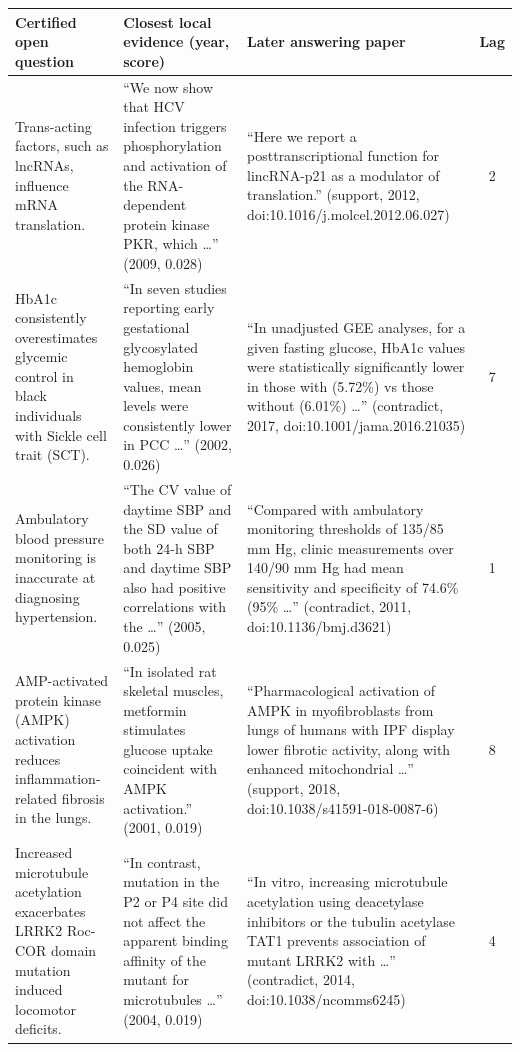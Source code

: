 \begin{tabular}{>{\raggedright\arraybackslash}p{3.0cm}>{\raggedright\arraybackslash}p{4.7cm}>{\raggedright\arraybackslash}p{6.6cm}c}
\toprule
Certified open question & Closest local evidence (year, score) & Later answering paper & Lag \\
\midrule
Trans-acting factors, such as lncRNAs, influence mRNA translation. & ``We now show that HCV infection triggers phosphorylation and activation of the RNA-dependent protein kinase PKR, which \ldots{}'' (2009, 0.028) & ``Here we report a posttranscriptional function for lincRNA-p21 as a modulator of translation.'' (support, 2012, doi:10.1016/j.molcel.2012.06.027) & 2 \\
HbA1c consistently overestimates glycemic control in black individuals with Sickle cell trait (SCT). & ``In seven studies reporting early gestational glycosylated hemoglobin values, mean levels were consistently lower in PCC \ldots{}'' (2002, 0.026) & ``In unadjusted GEE analyses, for a given fasting glucose, HbA1c values were statistically significantly lower in those with (5.72\%) vs those without (6.01\%) \ldots{}'' (contradict, 2017, doi:10.1001/jama.2016.21035) & 7 \\
Ambulatory blood pressure monitoring is inaccurate at diagnosing hypertension. & ``The CV value of daytime SBP and the SD value of both 24-h SBP and daytime SBP also had positive correlations with the \ldots{}'' (2005, 0.025) & ``Compared with ambulatory monitoring thresholds of 135/85 mm Hg, clinic measurements over 140/90 mm Hg had mean sensitivity and specificity of 74.6\% (95\% \ldots{}'' (contradict, 2011, doi:10.1136/bmj.d3621) & 1 \\
AMP-activated protein kinase (AMPK) activation reduces inflammation-related fibrosis in the lungs. & ``In isolated rat skeletal muscles, metformin stimulates glucose uptake coincident with AMPK activation.'' (2001, 0.019) & ``Pharmacological activation of AMPK in myofibroblasts from lungs of humans with IPF display lower fibrotic activity, along with enhanced mitochondrial \ldots{}'' (support, 2018, doi:10.1038/s41591-018-0087-6) & 8 \\
Increased microtubule acetylation exacerbates LRRK2 Roc-COR domain mutation induced locomotor deficits. & ``In contrast, mutation in the P2 or P4 site did not affect the apparent binding affinity of the mutant for microtubules \ldots{}'' (2004, 0.019) & ``In vitro, increasing microtubule acetylation using deacetylase inhibitors or the tubulin acetylase  TAT1 prevents association of mutant LRRK2 with \ldots{}'' (contradict, 2014, doi:10.1038/ncomms6245) & 4 \\

\end{tabular}
